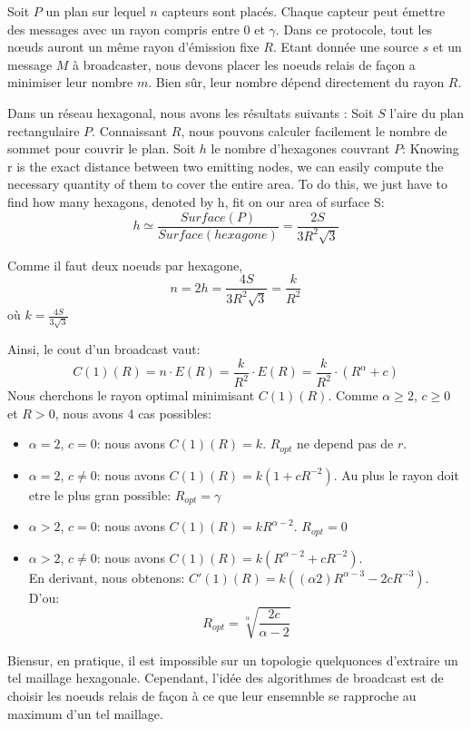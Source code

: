 Soit $P$ un plan sur lequel $n$ capteurs sont placés. Chaque capteur peut émettre des messages avec un rayon compris entre 0 et $\gamma$. Dans ce protocole, tout les nœuds auront un même rayon d'émission fixe $R$.
Etant donnée une source $s$ et un message $M$ à broadcaster, nous devons placer les noeuds relais de façon a minimiser leur nombre $m$. Bien sûr, leur nombre dépend directement du rayon $R$.
 

Dans un réseau hexagonal, nous avons les résultats suivants :
Soit $S$ l'aire du plan rectangulaire $P$. Connaissant $R$, nous pouvons calculer facilement le nombre de sommet pour couvrir le plan.
Soit $h$ le nombre d'hexagones couvrant $P$: 
Knowing r is the exact distance between two emitting
nodes, we can easily compute the necessary quantity of them
to cover the entire area. To do this, we just have to find how
many hexagons, denoted by h, fit on our area of surface S:
$$h \simeq \frac{Surface ( P)}{Surface(hexagone)}=\frac{2S}{3R^2 \sqrt{3}}$$

Comme il faut deux noeuds par hexagone,$$n=2h=\frac{4S}{3R^2 \sqrt{3}}= \frac{k}{R^2}$$ où $k=\frac{4S}{3 \sqrt{3}}$

Ainsi, le cout d'un broadcast vaut: $$C(1)(R)= n\cdot E(R)=\frac{k}{R^2}\cdot E(R)=\frac{k}{R^2}\cdot (R^\alpha+c)$$
Nous cherchons le rayon optimal minimisant $C(1)(R)$. Comme $\alpha\geq 2$, $c\geq 0$ et $R>0$, nous avons 4 cas possibles:
\begin{itemize}
 \item $\alpha=2$, $c=0$: nous avons $C(1)(R)=k$. $R_{opt}$ ne depend pas de $r$.
 \item $\alpha=2$, $c\neq0$: nous avons $C(1)(R)=k(1+cR^{-2})$. Au plus le rayon doit etre le plus gran possible: $R_{opt}=\gamma$
 \item $\alpha>2$, $c=0$: nous avons $C(1)(R)=kR^{\alpha-2}$. $R_{opt}=0$
 \item $\alpha>2$, $c\neq 0$: nous avons $C(1)(R)=k(R^{\alpha-2} + c R^{-2} ) $.\\
 En derivant, nous obtenons: $C'(1)(R)= k( (\alpha 2) R^{\alpha-3}- 2cR^{-3} ) $.\\
D'ou: $$R_{opt}=\sqrt[\alpha]{\frac{2c}{\alpha-2}}$$
\end{itemize}

Biensur, en pratique, il est impossible sur un topologie quelquonces d'extraire un tel maillage hexagonale. Cependant, l'idée des algorithmes de broadcast est de choisir les noeuds relais de façon à ce que leur ensemnble se rapproche 
au maximum d'un tel maillage.



